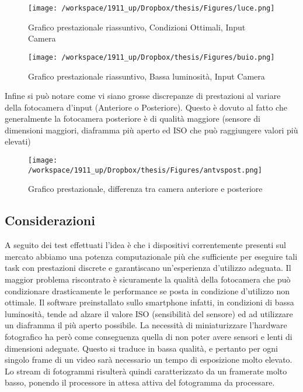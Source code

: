 \begin{figure}[H]\centering  
\texttt{[image: /workspace/1911\_up/Dropbox/thesis/Figures/luce.png]}
\caption[Grafico prestazionale riassuntivo, Condizioni Ottimali, Input Camera]{Grafico prestazionale riassuntivo, Condizioni Ottimali, Input Camera}
\label{pic-a}
\end{figure}




\begin{figure}[H]\centering  
\texttt{[image: /workspace/1911\_up/Dropbox/thesis/Figures/buio.png]}
\caption[Grafico prestazionale riassuntivo, Bassa luminosità, Input Camera]{Grafico prestazionale riassuntivo, Bassa luminosità, Input Camera}
\label{pic-a}
\end{figure}



Infine si può notare come vi siano grosse discrepanze di prestazioni al variare della fotocamera d'input (Anteriore o Posteriore). Questo è dovuto al fatto che generalmente la fotocamera posteriore è di qualità maggiore (sensore di dimensioni maggiori, diaframma più aperto ed ISO che può raggiungere valori più elevati)
\\
\begin{figure}[H]\centering  
\texttt{[image: /workspace/1911\_up/Dropbox/thesis/Figures/antvspost.png]}
\caption[Grafico prestazionale, differenza tra camera anteriore e posteriore]{Grafico prestazionale, differenza tra camera anteriore e posteriore}
\label{pic-a}
\end{figure}

\subsection{Considerazioni}

A seguito dei test effettuati l'idea è che i dispositivi correntemente presenti sul mercato abbiamo una potenza computazionale più che sufficiente per eseguire tali task con prestazioni discrete e garantiscano un'esperienza d'utilizzo adeguata. Il maggior problema riscontrato è sicuramente la qualità della fotocamera che può condizionare drasticamente le performance se posta in condizione d'utilizzo non ottimale. Il software preinstallato sullo smartphone infatti, in condizioni di bassa luminosità, tende ad alzare il valore ISO (sensibilità del sensore) ed ad utilizzare un diaframma il più aperto possibile. La necessità di miniaturizzare l'hardware fotografico ha però come conseguenza quella di non poter avere sensori e lenti di dimensioni adeguate. Questo si traduce in bassa qualità, e pertanto per ogni singolo frame di un video sarà necessario un tempo di esposizione molto elevato. Lo stream di fotogrammi risulterà quindi caratterizzato da un framerate molto basso, ponendo il processore in attesa attiva del fotogramma da processare. 

